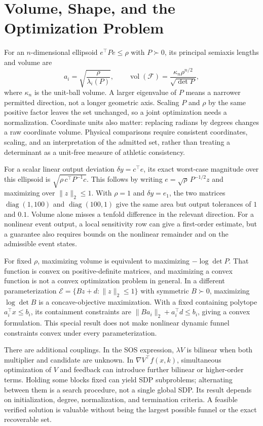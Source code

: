 \documentclass[12pt, openany]{book}
\theoremstyle{plain}
\begin{document}
\section{Volume, Shape, and the Optimization Problem}

For an $n$-dimensional ellipsoid $e^\top P e\leq\rho$ with $P\succ0$, its principal semiaxis lengths and volume are
\begin{equation}
 a_i=\sqrt{\frac{\rho}{\lambda_i(P)}},\qquad
 \operatorname{vol}(\mathcal F)=\frac{\kappa_n\rho^{n/2}}{\sqrt{\det P}},
 \label{eq:funnel_ellipsoid_volume}
\end{equation}
where $\kappa_n$ is the unit-ball volume. A larger eigenvalue of $P$ means a narrower permitted direction, not a longer geometric axis. Scaling $P$ and $\rho$ by the same positive factor leaves the set unchanged, so a joint optimization needs a normalization. Coordinate units also matter: replacing radians by degrees changes a raw coordinate volume. Physical comparisons require consistent coordinates, scaling, and an interpretation of the admitted set, rather than treating a determinant as a unit-free measure of athletic consistency.

For a scalar linear output deviation $\delta y=c^\top e$, its exact worst-case magnitude over this ellipsoid is $\sqrt{\rho\,c^\top P^{-1}c}$. This follows by writing $e=\sqrt\rho\,P^{-1/2}z$ and maximizing over $\|z\|_2\leq1$. With $\rho=1$ and $\delta y=e_1$, the two matrices $\operatorname{diag}(1,100)$ and $\operatorname{diag}(100,1)$ give the same area but output tolerances of $1$ and $0.1$. Volume alone misses a tenfold difference in the relevant direction. For a nonlinear event output, a local sensitivity row can give a first-order estimate, but a guarantee also requires bounds on the nonlinear remainder and on the admissible event states.

For fixed $\rho$, maximizing volume is equivalent to maximizing $-\log\det P$. That function is convex on positive-definite matrices, and maximizing a convex function is not a convex optimization problem in general. In a different parameterization $\mathcal E=\{Bz+d:\|z\|_2\leq1\}$ with symmetric $B\succ0$, maximizing $\log\det B$ is a concave-objective maximization. With a fixed containing polytope $a_i^\top x\leq b_i$, its containment constraints are $\|Ba_i\|_2+a_i^\top d\leq b_i$, giving a convex formulation. This special result does not make nonlinear dynamic funnel constraints convex under every parameterization.

There are additional couplings. In the SOS expression, $\lambda V$ is bilinear when both multiplier and candidate are unknown. In $\nabla V^\top f(x,k)$, simultaneous optimization of $V$ and feedback can introduce further bilinear or higher-order terms. Holding some blocks fixed can yield SDP subproblems; alternating between them is a search procedure, not a single global SDP. Its result depends on initialization, degree, normalization, and termination criteria. A feasible verified solution is valuable without being the largest possible funnel or the exact recoverable set.
\end{document}

